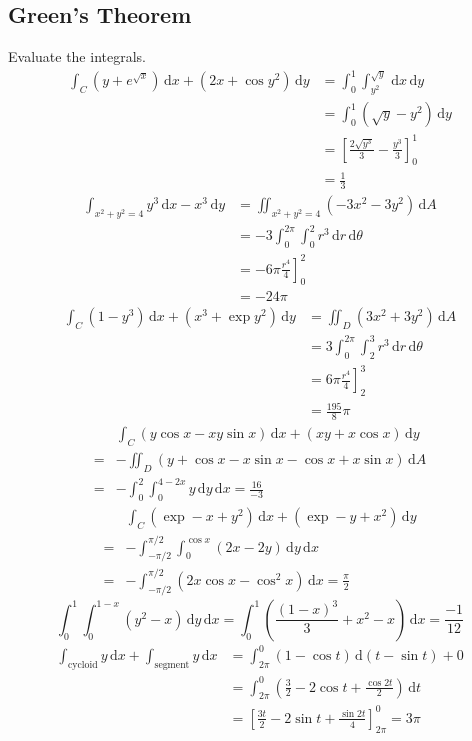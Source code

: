 \documentclass[a4paper,12pt]{article}
\newcommand{\ud}{\,\mathrm{d}}
\begin{document}
\subsection{Green's Theorem}
Evaluate the integrals.
\begin{align*}
  \int_C\left(y+e^{\sqrt x}\right)\ud x + (2x + \cos y^2)\ud y
  &= \int_0^1\int_{y^2}^{\sqrt y}\ud x\ud y\\
  &= \int_0^1(\sqrt y - y^2)\ud y\\
  &= \left[\frac{2\sqrt{y^3}}{3} - \frac{y^3}{3}\right]_0^1\\
  &= \frac{1}{3}\tag{7}
\end{align*}
\begin{align*}
  \int_{x^2+y^2=4}y^3\ud x - x^3\ud y
  &= \iint_{x^2+y^2=4}(-3x^2-3y^2)\ud A\\
  &= -3\int_0^{2\pi}\int_0^2 r^3\ud r\ud\theta\\
  &= -6\pi\left.\frac{r^4}{4}\right]_0^2\\
  &= -24\pi\tag{9}
\end{align*}
\begin{align*}
  \int_C(1-y^3)\ud x + (x^3+\exp y^2)\ud y
  &= \iint_D(3x^2 + 3y^2)\ud A\\
  &= 3\int_0^{2\pi}\int_2^3 r^3\ud r\ud\theta\\
  &= 6\pi\left.\frac{r^4}{4}\right]_2^3\\
  &= \frac{195}{8}\pi\tag{10}
\end{align*}
\begin{align*}
  &\int_C(y\cos x - xy\sin x)\ud x + (xy + x\cos x)\ud y\\
= &-\iint_D(y + \cos x - x\sin x - \cos x + x\sin x)\ud A\\
= &-\int_0^2\int_0^{4-2x}y\ud y\ud x = \frac{16}{-3}\tag{11}
\end{align*}
\begin{align*}
  &\int_C(\exp-x + y^2)\ud x + (\exp-y + x^2)\ud y\\
  =&-\int_{-\pi/2}^{\pi/2}\int_0^{\cos x}(2x - 2y)\ud y\ud x\\
  =&-\int_{-\pi/2}^{\pi/2}(2x\cos x - \cos^2 x)\ud x
  =\frac\pi 2\tag{12}
\end{align*}
\[\int_0^1\int_0^{1-x}(y^2 - x)\ud y\ud x
= \int_0^1\left(\frac{(1-x)^3}{3} + x^2 - x\right)\ud x
= \frac{-1}{12}\tag{17}\]
\begin{align*}
  \int_\text{cycloid}y\ud x + \int_\text{segment}y\ud x
  &= \int_{2\pi}^0(1-\cos t)\ud(t-\sin t) + 0\\
  &= \int_{2\pi}^0\left(\frac{3}{2} - 2\cos t + \frac{\cos 2t}{2}\right)\ud t\\
  &= \left[\frac{3t}{2} - 2\sin t + \frac{\sin 2t}{4}\right]_{2\pi}^0
  = 3\pi\tag{19}
\end{align*}
\end{document}

